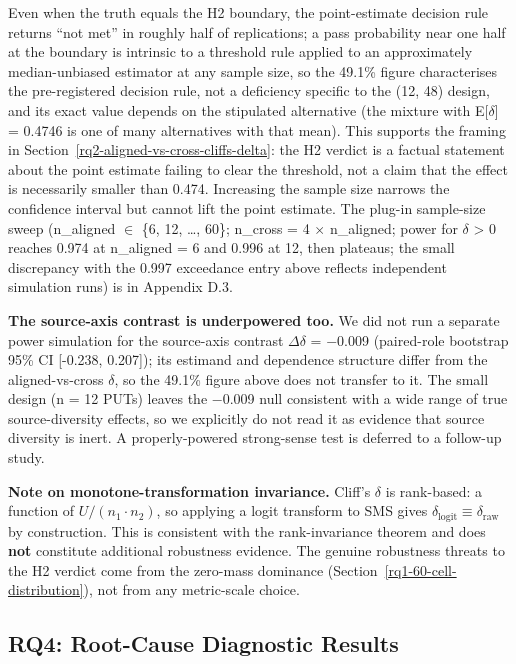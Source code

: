 \documentclass[manuscript,screen,review]{acmart}
\begin{document}
Even when the truth equals the H2 boundary, the point-estimate
decision rule returns ``not met'' in roughly half of replications; a
pass probability near one half at the boundary is intrinsic to a
threshold rule applied to an approximately median-unbiased estimator
at any sample size, so the 49.1\% figure characterises the
pre-registered decision rule, not a deficiency specific to the (12,
48) design, and its exact value depends on the stipulated alternative
(the mixture with E[$\delta$] = 0.4746 is one of many alternatives
with that mean). This supports the
framing in Section~\ref{rq2-aligned-vs-cross-cliffs-delta}: the H2 verdict is a factual statement about the point
estimate failing to clear the threshold, not a claim that the effect is
necessarily smaller than 0.474. Increasing the sample size narrows the
confidence interval but cannot lift the point estimate. The plug-in
sample-size sweep (n\_aligned $\in$ \{6, 12, \ldots, 60\}; n\_cross = 4 $\times$
n\_aligned; power for $\delta$ \textgreater{} 0 reaches 0.974 at n\_aligned = 6
and 0.996 at 12, then plateaus; the small discrepancy with the 0.997
exceedance entry above reflects independent simulation runs) is in
Appendix D.3.

\textbf{The source-axis contrast is underpowered too.} We did not run a
separate power simulation for the source-axis contrast $\Delta\delta$ =
$-$0.009 (paired-role bootstrap 95\% CI {[}-0.238, 0.207{]}); its estimand and dependence structure differ
from the aligned-vs-cross $\delta$, so the 49.1\% figure above does not
transfer to it. The small design (n = 12 PUTs) leaves the $-$0.009 null
consistent with a wide range of true source-diversity effects, so we
explicitly do not read it as evidence that source diversity is inert. A
properly-powered strong-sense test is deferred to a follow-up study.

\textbf{Note on monotone-transformation invariance.} Cliff's $\delta$ is
rank-based: a function of $U / (n_1 \cdot n_2)$, so applying a logit transform to
SMS gives $\delta_{\mathrm{logit}} \equiv \delta_{\mathrm{raw}}$ by construction. This is consistent with the
rank-invariance theorem and does \textbf{not} constitute additional
robustness evidence. The genuine robustness threats to the H2 verdict
come from the zero-mass dominance (Section~\ref{rq1-60-cell-distribution}), not from any metric-scale
choice.

\subsection{RQ4: Root-Cause Diagnostic Results}\label{h5-lrca-mass}
\end{document}
